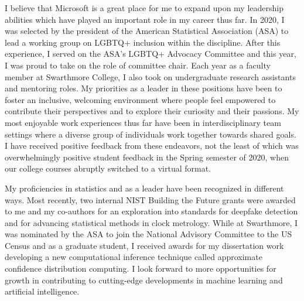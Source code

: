 \documentclass[11pt,a4paper,sans]{moderncv}
\begin{document}
	I believe that Microsoft is a great place for me to expand upon my leadership abilities which have played an important role in my career thus far. In 2020, I was selected by the president of the American Statistical Association (ASA) to lead a working group on LGBTQ+ inclusion within the discipline. After this experience, I served on the ASA's LGBTQ+ Advocacy Committee and this year, I was proud to take on the role of committee chair. Each year as a faculty member at Swarthmore College, I also took on undergraduate research assistants and mentoring roles. My priorities as a leader in these positions have been to foster an inclusive, welcoming environment where people feel empowered to contribute their perspectives and to explore their curiosity and their passions. My most enjoyable work experiences thus far have been in interdisciplinary team settings where a diverse group of individuals work together towards shared goals. I have received positive feedback from these endeavors, not the least of which was overwhelmingly positive student feedback in the Spring semester of 2020, when our college courses abruptly switched to a virtual format.   


	My proficiencies in statistics and as a leader have been recognized in different ways. Most recently, two internal NIST Building the Future grants were awarded to me and my co-authors for an exploration into standards for deepfake detection and for advancing statistical methods in clock metrology. While at Swarthmore, I was nominated by the ASA to join the National Advisory Committee to the US Census and as a graduate student, I received awards for my dissertation work developing a new computational inference technique called approximate confidence distribution computing. I look forward to more opportunities for growth in contributing to cutting-edge developments in machine learning and artificial intelligence. 
\end{document}
